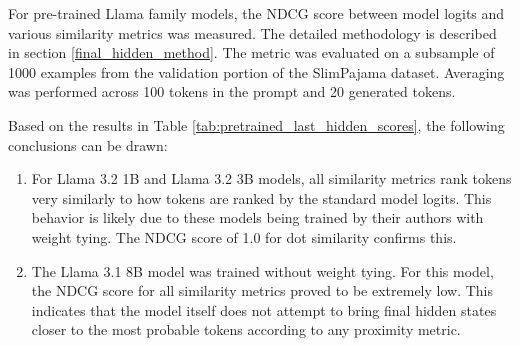 For pre-trained Llama family models, the NDCG score between model logits and various similarity metrics was measured. The detailed methodology is described in section \ref{final_hidden_method}. The metric was evaluated on a subsample of 1000 examples from the validation portion of the SlimPajama dataset. Averaging was performed across 100 tokens in the prompt and 20 generated tokens.


Based on the results in Table \ref{tab:pretrained_last_hidden_scores}, the following conclusions can be drawn:
\begin{enumerate}
    \item For Llama 3.2 1B and Llama 3.2 3B models, all similarity metrics rank tokens very similarly to how tokens are ranked by the standard model logits. This behavior is likely due to these models being trained by their authors with weight tying. The NDCG score of 1.0 for dot similarity confirms this.
    \item The Llama 3.1 8B model was trained without weight tying. For this model, the NDCG score for all similarity metrics proved to be extremely low. This indicates that the model itself does not attempt to bring final hidden states closer to the most probable tokens according to any proximity metric.
\end{enumerate}


